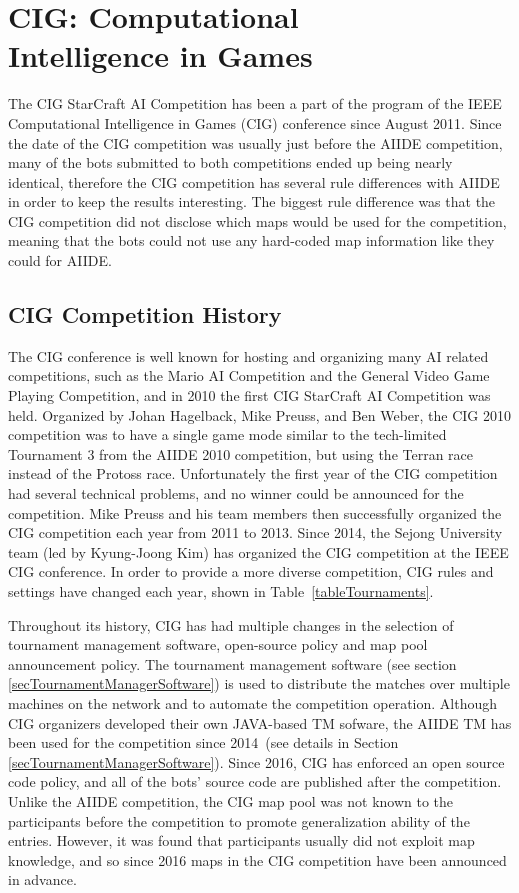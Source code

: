 

\section{CIG: Computational\\ Intelligence in Games}\label{subsecCIG}

The CIG StarCraft AI Competition has been a part of the program of the IEEE Computational Intelligence in Games (CIG) conference since August 2011.  Since the date of the CIG competition was usually just before the AIIDE competition, many of the bots submitted to both competitions ended up being nearly identical, therefore the CIG competition has several rule differences with AIIDE in order to keep the results interesting. The biggest rule difference was that the CIG competition did not disclose which maps would be used for the competition, meaning that the bots could not use any hard-coded map information like they could for AIIDE.

\subsection{CIG Competition History}
The CIG conference is well known for hosting and organizing many AI related competitions, such as the Mario AI Competition and the General Video Game Playing Competition, and in 2010 the first CIG StarCraft AI Competition was held. Organized by Johan Hagelback, Mike Preuss, and Ben Weber, the CIG 2010 competition was to have a single game mode similar to the tech-limited Tournament 3 from the AIIDE 2010 competition, but using the Terran race instead of the Protoss race. Unfortunately the first year of the CIG competition had several technical problems, and no winner could be announced for the competition. Mike Preuss and his team members then successfully organized the CIG competition each year from 2011 to 2013. Since 2014, the Sejong University team (led by Kyung-Joong Kim) has organized the CIG  competition at the IEEE CIG conference. In order to provide a more diverse competition, CIG rules and settings have changed each year, shown in Table~\ref{tableTournaments}. 

Throughout its history, CIG has had multiple changes in the selection of tournament management software, open-source policy and map pool announcement policy. The tournament management software (see section \ref{secTournamentManagerSoftware}) is used to distribute the matches over multiple machines on the network and to automate the competition operation. Although CIG organizers developed their own JAVA-based TM sofware, the AIIDE TM has been used for the competition since 2014~(see details in Section \ref{secTournamentManagerSoftware}). Since 2016, CIG has enforced an open source code policy, and all of the bots' source code are published after the competition. Unlike the AIIDE competition, the CIG map pool was not known to the participants before the competition to promote generalization ability of the entries. However, it was found that participants usually did not exploit map knowledge, and so since 2016 maps in the CIG competition have been announced in advance. 
 
